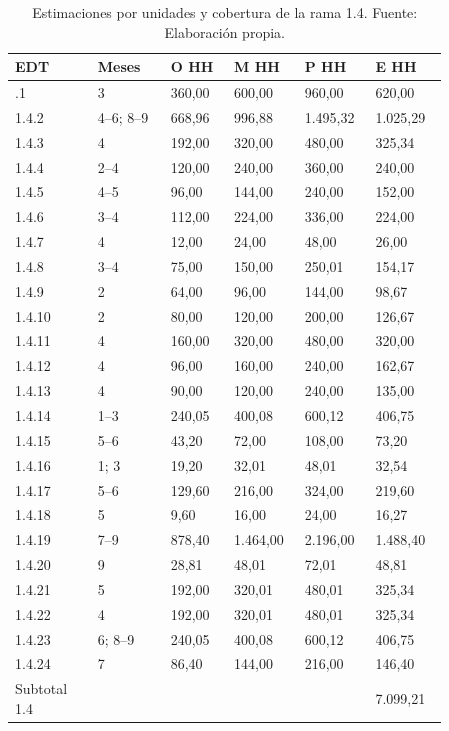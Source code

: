 \documentclass[11pt]{article}
\begin{document}
\begingroup
\small
\begin{longtable}{@{}p{0.17\linewidth}p{0.15\linewidth}p{0.13\linewidth}p{0.13\linewidth}p{0.13\linewidth}p{0.15\linewidth}@{}}
\caption[Estimaciones por unidades y cobertura de la rama 1.4]{Estimaciones por unidades y cobertura de la rama 1.4. Fuente: Elaboración propia.}\label{tab:t15-tareas-4}\\
\toprule
\textbf{EDT} & \textbf{Meses} & \textbf{O HH} & \textbf{M HH} & \textbf{P HH} & \textbf{E HH} \\
\midrule
\endhead
\bottomrule
\endlastfoot
1.4.1 & 3 & 360,00 & 600,00 & 960,00 & 620,00 \\
1.4.2 & 4--6; 8--9 & 668,96 & 996,88 & 1.495,32 & 1.025,29 \\
1.4.3 & 4 & 192,00 & 320,00 & 480,00 & 325,34 \\
1.4.4 & 2--4 & 120,00 & 240,00 & 360,00 & 240,00 \\
1.4.5 & 4--5 & 96,00 & 144,00 & 240,00 & 152,00 \\
1.4.6 & 3--4 & 112,00 & 224,00 & 336,00 & 224,00 \\
1.4.7 & 4 & 12,00 & 24,00 & 48,00 & 26,00 \\
1.4.8 & 3--4 & 75,00 & 150,00 & 250,01 & 154,17 \\
1.4.9 & 2 & 64,00 & 96,00 & 144,00 & 98,67 \\
1.4.10 & 2 & 80,00 & 120,00 & 200,00 & 126,67 \\
1.4.11 & 4 & 160,00 & 320,00 & 480,00 & 320,00 \\
1.4.12 & 4 & 96,00 & 160,00 & 240,00 & 162,67 \\
1.4.13 & 4 & 90,00 & 120,00 & 240,00 & 135,00 \\
1.4.14 & 1--3 & 240,05 & 400,08 & 600,12 & 406,75 \\
1.4.15 & 5--6 & 43,20 & 72,00 & 108,00 & 73,20 \\
1.4.16 & 1; 3 & 19,20 & 32,01 & 48,01 & 32,54 \\
1.4.17 & 5--6 & 129,60 & 216,00 & 324,00 & 219,60 \\
1.4.18 & 5 & 9,60 & 16,00 & 24,00 & 16,27 \\
1.4.19 & 7--9 & 878,40 & 1.464,00 & 2.196,00 & 1.488,40 \\
1.4.20 & 9 & 28,81 & 48,01 & 72,01 & 48,81 \\
1.4.21 & 5 & 192,00 & 320,01 & 480,01 & 325,34 \\
1.4.22 & 4 & 192,00 & 320,01 & 480,01 & 325,34 \\
1.4.23 & 6; 8--9 & 240,05 & 400,08 & 600,12 & 406,75 \\
1.4.24 & 7 & 86,40 & 144,00 & 216,00 & 146,40 \\
Subtotal 1.4 &  &  &  &  & 7.099,21 \\
\end{longtable}
\endgroup
\end{document}
